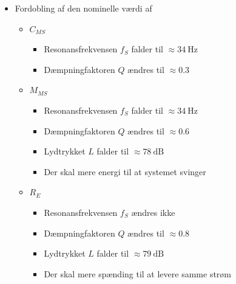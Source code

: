 \begin{itemize}
	\item Fordobling af den nominelle værdi af 
	\begin{itemize}
		\item $C_{MS}$
		\begin{itemize}
			\item Resonansfrekvensen $f_S$ falder til $\approx\SI{34}{\hertz}$
			\item Dæmpningfaktoren $Q$ ændres til $\approx 0.3$
		\end{itemize}
		\item $M_{MS}$
		\begin{itemize}
			\item Resonansfrekvensen $f_S$ falder til $\approx\SI{34}{\hertz}$
			\item Dæmpningfaktoren $Q$ ændres til $\approx 0.6$
			\item Lydtrykket $L$ falder til $\approx \SI{78}{\deci\bel}$
			\item Der skal mere energi til at systemet svinger
		\end{itemize} 
		\item $R_E$
		\begin{itemize}
			\item Resonansfrekvensen $f_S$ ændres ikke
			\item Dæmpningfaktoren $Q$ ændres til $\approx 0.8$
			\item Lydtrykket $L$ falder til $\approx \SI{79}{\deci\bel}$
			\item Der skal mere spænding til at levere samme strøm
		\end{itemize}
	\end{itemize}
\end{itemize}

